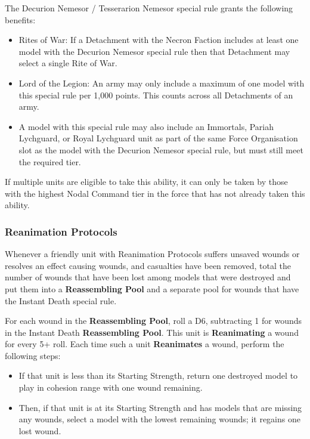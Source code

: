 The Decurion Nemesor / Tesserarion Nemesor special rule grants the following benefits:

\begin{itemize}
	\itemsep 0pt
	\item Rites of War: If a Detachment with the Necron Faction includes at least one model with the Decurion Nemesor special rule then that Detachment may select a single Rite of War. 
	\item Lord of the Legion: An army may only include a maximum of one model with this special rule per 1,000 points. This counts across all Detachments of an army.
	\item A model with this special rule may also include an Immortals, Pariah Lychguard, or Royal Lychguard unit as part of the same Force Organisation slot as the model with the Decurion Nemesor special rule, but must still meet the required  tier.
\end{itemize}

If multiple units are eligible to take this ability, it can only be taken by those with the highest Nodal Command tier in the force that has not already taken this ability. 

\subsubsection{Reanimation Protocols} \label{Reanimation Protocols}

Whenever a friendly unit with Reanimation Protocols suffers unsaved wounds or resolves an effect causing wounds, and casualties have been removed, total the number of wounds that have been lost among models that were destroyed and put them into a \textbf{Reassembling Pool} and a separate pool for wounds that have the Instant Death special rule.

For each wound in the \textbf{Reassembling Pool}, roll a D6, subtracting 1 for wounds in the Instant Death \textbf{Reassembling Pool}. This unit is \textbf{Reanimating} a wound for every 5+ roll. Each time such a unit \textbf{Reanimates} a wound, perform the following steps:

\begin{itemize}
	\itemsep 0pt
	\item If that unit is less than its Starting Strength, return one destroyed model to play in cohesion range with one wound remaining.
	\item Then, if that unit is at its Starting Strength and has models that are missing any wounds, select a model with the lowest remaining wounds; it regains one lost wound.
\end{itemize}

